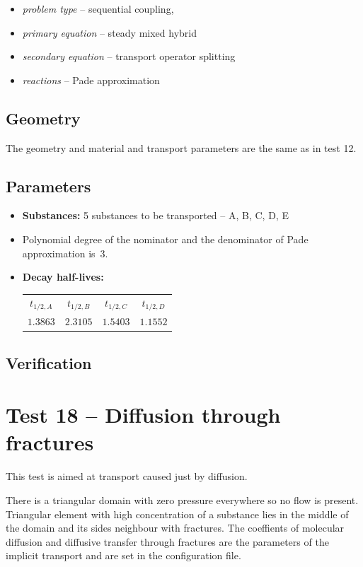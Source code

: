 \begin{itemize} 
    \item \emph{problem type} -- sequential coupling, 
    \item \emph{primary equation} -- steady mixed hybrid
    \item \emph{secondary equation} -- transport operator splitting
    \item \emph{reactions} -- Pade approximation
  \end{itemize}

\subsection*{Geometry}
The geometry and material and transport parameters are the same as in test 12.


\subsection*{Parameters}
\begin{itemize}
  \item \textbf{Substances:} 5 substances to be transported -- A, B, C, D, E
  \item Polynomial degree of the nominator and the denominator of Pade approximation is~3.
  \item \textbf{Decay half-lives:} 
    \begin{tabular}[c]{|c|c|c|c|}
      \hline
      $t_{1/2,A}$ & $t_{1/2,B}$  & $t_{1/2,C}$ & $t_{1/2,D}$\\[4pt]
      $1.3863$ & $2.3105$ & $1.5403$ & $1.1552$\\[4pt]
      \hline
    \end{tabular}
\end{itemize}

\subsection*{Verification}



\section{Test 18 -- Diffusion through fractures}
This test is aimed at transport caused just by diffusion. 

There is a triangular domain with zero pressure everywhere so no flow is present. Triangular element with high concentration of a substance lies in the middle of the domain and its sides neighbour with fractures.
The coeffients of molecular diffusion and diffusive transfer through fractures are the parameters of the implicit transport and are set in the configuration file.

